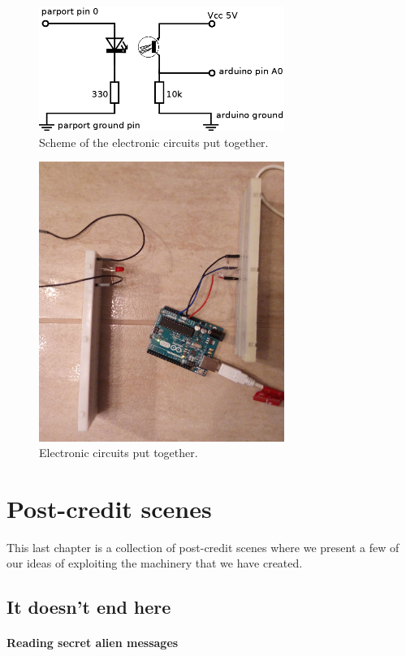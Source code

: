 \documentclass[12pt]{report}
\begin{document}
\begin{figure}[H]
\centering\includegraphics[width=8cm]{scheme}
\caption{Scheme of the electronic circuits put together.}				
\label{fig:circuits}
\end{figure}

\begin{figure}[H]
\centering\includegraphics[width=8cm]{circuits}
\caption{Electronic circuits put together.}				
\label{fig:circuits_pic}
\end{figure}



\chapter{Post-credit scenes}

This last chapter is a collection of post-credit scenes where we present a few of our ideas of exploiting the machinery that we have created.

\section{It doesn't end here}



\subsubsection{Reading secret alien messages}
\end{document}
